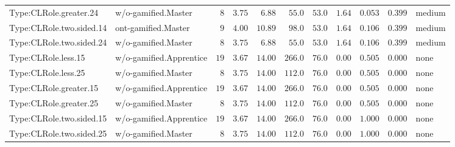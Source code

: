 \documentclass[6pt,a4paper]{article}
\begin{document}
{\begin{longtable}{llrrrrrrrrl}
Type:CLRole.greater.24&w/o-gamified.Master&$ 8$&$3.75$&$ 6.88$&$ 55.0$&$ 53.0$&$ 1.64$&$0.053$&$0.399$&medium\tabularnewline
Type:CLRole.two.sided.14&ont-gamified.Master&$ 9$&$4.00$&$10.89$&$ 98.0$&$ 53.0$&$ 1.64$&$0.106$&$0.399$&medium\tabularnewline
Type:CLRole.two.sided.24&w/o-gamified.Master&$ 8$&$3.75$&$ 6.88$&$ 55.0$&$ 53.0$&$ 1.64$&$0.106$&$0.399$&medium\tabularnewline
Type:CLRole.less.15&w/o-gamified.Apprentice&$19$&$3.67$&$14.00$&$266.0$&$ 76.0$&$ 0.00$&$0.505$&$0.000$&none\tabularnewline
Type:CLRole.less.25&w/o-gamified.Master&$ 8$&$3.75$&$14.00$&$112.0$&$ 76.0$&$ 0.00$&$0.505$&$0.000$&none\tabularnewline
Type:CLRole.greater.15&w/o-gamified.Apprentice&$19$&$3.67$&$14.00$&$266.0$&$ 76.0$&$ 0.00$&$0.505$&$0.000$&none\tabularnewline
Type:CLRole.greater.25&w/o-gamified.Master&$ 8$&$3.75$&$14.00$&$112.0$&$ 76.0$&$ 0.00$&$0.505$&$0.000$&none\tabularnewline
\newpage
Type:CLRole.two.sided.15&w/o-gamified.Apprentice&$19$&$3.67$&$14.00$&$266.0$&$ 76.0$&$ 0.00$&$1.000$&$0.000$&none\tabularnewline
Type:CLRole.two.sided.25&w/o-gamified.Master&$ 8$&$3.75$&$14.00$&$112.0$&$ 76.0$&$ 0.00$&$1.000$&$0.000$&none\tabularnewline
\hline
\end{longtable}}
\end{document}
